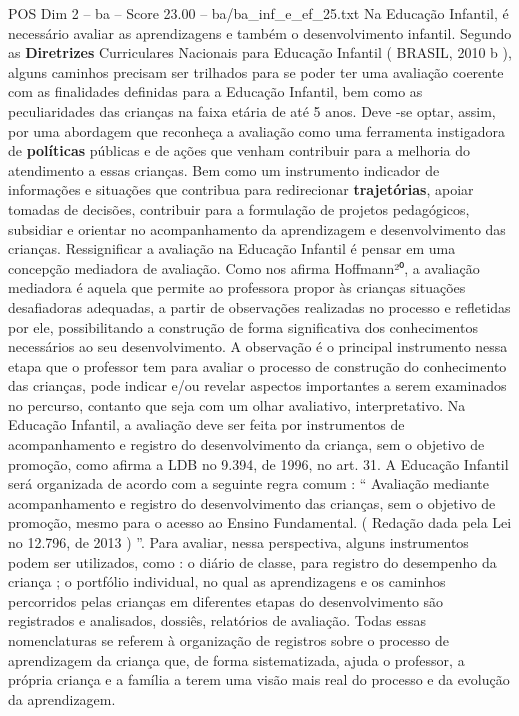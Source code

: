 \begin{textsample}{POS Dim 2 – ba – Score 23.00 – ba/ba\_inf\_e\_ef\_25.txt}
Na Educação Infantil, é necessário avaliar as aprendizagens e também o desenvolvimento infantil.
Segundo as \textbf{Diretrizes} Curriculares Nacionais para Educação Infantil ( BRASIL, 2010 b ), alguns caminhos precisam ser trilhados para se poder ter uma avaliação coerente com as finalidades definidas para a Educação Infantil, bem como as peculiaridades das crianças na faixa etária de até 5 anos.
Deve -se optar, assim, por uma abordagem que reconheça a avaliação como uma ferramenta instigadora de \textbf{políticas} públicas e de ações que venham contribuir para a melhoria do atendimento a essas crianças.
Bem como um instrumento indicador de informações e situações que contribua para redirecionar \textbf{trajetórias}, apoiar tomadas de decisões, contribuir para a formulação de projetos pedagógicos, subsidiar e orientar no acompanhamento da aprendizagem e desenvolvimento das crianças.
Ressignificar a avaliação na Educação Infantil é pensar em uma concepção mediadora de avaliação.
Como nos afirma Hoffmann²⁰, a avaliação mediadora é aquela que permite ao professora propor às crianças situações desafiadoras adequadas, a partir de observações realizadas no processo e refletidas por ele, possibilitando a construção de forma significativa dos conhecimentos necessários ao seu desenvolvimento.
A observação é o principal instrumento nessa etapa que o professor tem para avaliar o processo de construção do conhecimento das crianças, pode indicar e/ou revelar aspectos importantes a serem examinados no percurso, contanto que seja com um olhar avaliativo, interpretativo.
Na Educação Infantil, a avaliação deve ser feita por instrumentos de acompanhamento e registro do desenvolvimento da criança, sem o objetivo de promoção, como afirma a LDB no 9.394, de 1996, no art. 31.
A Educação Infantil será organizada de acordo com a seguinte regra comum : “ Avaliação mediante acompanhamento e registro do desenvolvimento das crianças, sem o objetivo de promoção, mesmo para o acesso ao Ensino Fundamental. ( Redação dada pela Lei no 12.796, de 2013 ) ”.
Para avaliar, nessa perspectiva, alguns instrumentos podem ser utilizados, como : o diário de classe, para registro do desempenho da criança ; o portfólio individual, no qual as aprendizagens e os caminhos percorridos pelas crianças em diferentes etapas do desenvolvimento são registrados e analisados, dossiês, relatórios de avaliação.
Todas essas nomenclaturas se referem à organização de registros sobre o processo de aprendizagem da criança que, de forma sistematizada, ajuda o professor, a própria criança e a família a terem uma visão mais real do processo e da evolução da aprendizagem.

\end{textsample}
